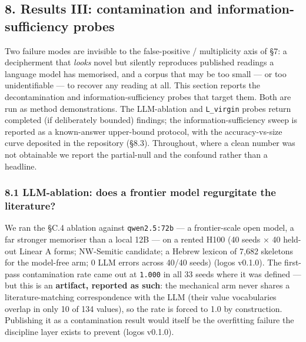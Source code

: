 \documentclass[
  10pt,
]{article}
\begin{document}
\hypertarget{results-iii-contamination-and-information-sufficiency-probes}{%
\subsection{8. Results III: contamination and information-sufficiency
probes}\label{results-iii-contamination-and-information-sufficiency-probes}}

Two failure modes are invisible to the false-positive / multiplicity
axis of §7: a decipherment that \emph{looks} novel but silently
reproduces published readings a language model has memorised, and a
corpus that may be too small --- or too unidentifiable --- to recover
any reading at all. This section reports the decontamination and
information-sufficiency probes that target them. Both are run as method
demonstrations. The LLM-ablation and \texttt{L\_virgin} probes return
completed (if deliberately bounded) findings; the
information-sufficiency sweep is reported as a known-answer upper-bound
protocol, with the accuracy-vs-size curve deposited in the repository
(§8.3). Throughout, where a clean number was not obtainable we report
the partial-null and the confound rather than a headline.

\hypertarget{llm-ablation-does-a-frontier-model-regurgitate-the-literature}{%
\subsubsection{8.1 LLM-ablation: does a frontier model regurgitate the
literature?}\label{llm-ablation-does-a-frontier-model-regurgitate-the-literature}}

We ran the §C.4 ablation against \texttt{qwen2.5:72b} --- a
frontier-scale open model, a far stronger memoriser than a local 12B ---
on a rented H100 (40 seeds × 40 held-out Linear A forms; NW-Semitic
candidate; a Hebrew lexicon of 7,682 skeletons for the model-free arm; 0
LLM errors across 40/40 seeds) (logos v0.1.0). The first-pass
contamination rate came out at \texttt{1.000} in all 33 seeds where it
was defined --- but this is an \textbf{artifact, reported as such}: the
mechanical arm never shares a literature-matching correspondence with
the LLM (their value vocabularies overlap in only 10 of 134 values), so
the rate is forced to 1.0 by construction. Publishing it as a
contamination result would itself be the overfitting failure the
discipline layer exists to prevent (logos v0.1.0).
\end{document}
